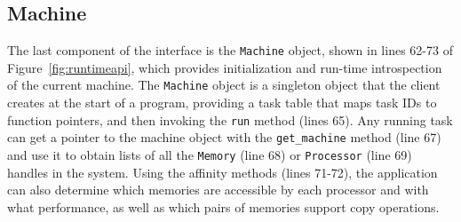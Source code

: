 



\subsection{Machine}
\label{subsec:machmodel}
The last component of the interface is the {\tt Machine} object, shown in lines 62-73 of Figure~\ref{fig:runtimeapi},
which provides initialization and run-time introspection
of the current machine.
The {\tt Machine} object is a singleton object that the client creates at the start of a
program, providing a task table that maps task IDs to function pointers,
and then invoking the {\tt run} method (lines 65).
Any running task can get a pointer to the machine object with the
{\tt get\_machine} method (line 67) and use it to obtain lists of all the {\tt Memory} (line 68) or 
{\tt Processor} (line 69) handles in the system.  Using the affinity methods (lines 71-72),
the application can also determine which memories are accessible by each
processor and with what performance, as well as which pairs of memories support copy operations.



